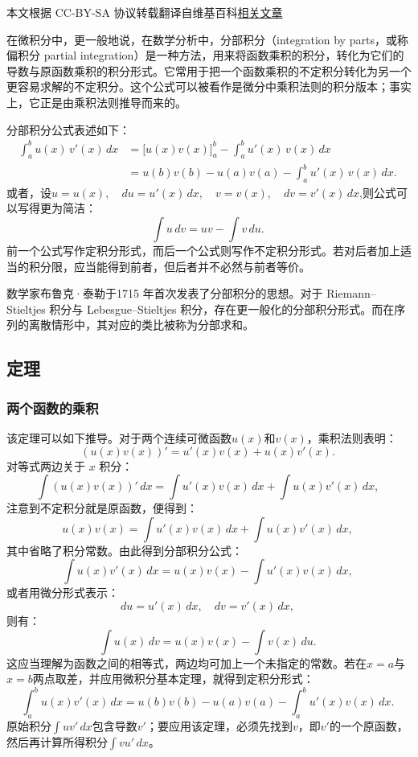 
本文根据 CC-BY-SA 协议转载翻译自维基百科\href{https://en.wikipedia.org/wiki/Integration_by_parts}{相关文章}

在微积分中，更一般地说，在数学分析中，分部积分（integration by parts，或称偏积分 partial integration）是一种方法，用来将函数乘积的积分，转化为它们的导数与原函数乘积的积分形式。它常用于把一个函数乘积的不定积分转化为另一个更容易求解的不定积分。这个公式可以被看作是微分中乘积法则的积分版本；事实上，它正是由乘积法则推导而来的。

分部积分公式表述如下：
$$
\begin{aligned}
\int_{a}^{b} u(x)\,v'(x)\,dx &= \Big[u(x)v(x)\Big]_{a}^{b} - \int_{a}^{b} u'(x)\,v(x)\,dx \\
&= u(b)v(b) - u(a)v(a) - \int_{a}^{b} u'(x)\,v(x)\,dx .
\end{aligned}~
$$
或者，设$u = u(x), \quad du = u'(x)\,dx, \quad v = v(x), \quad dv = v'(x)\,dx$,则公式可以写得更为简洁：
$$
\int u\,dv = uv - \int v\,du .~
$$
前一个公式写作定积分形式，而后一个公式则写作不定积分形式。若对后者加上适当的积分限，应当能得到前者，但后者并不必然与前者等价。

数学家布鲁克·泰勒于1715 年首次发表了分部积分的思想。对于 Riemann–Stieltjes 积分与 Lebesgue–Stieltjes 积分，存在更一般化的分部积分形式。而在序列的离散情形中，其对应的类比被称为分部求和。
\subsection{定理}
\subsubsection{两个函数的乘积}
该定理可以如下推导。对于两个连续可微函数$u(x)$和$v(x)$，乘积法则表明：
$$
(u(x)v(x))' = u'(x)v(x) + u(x)v'(x).~
$$
对等式两边关于 $x$ 积分：
$$
\int (u(x)v(x))'\,dx = \int u'(x)v(x)\,dx + \int u(x)v'(x)\,dx,~
$$
注意到不定积分就是原函数，便得到：
$$
u(x)v(x) = \int u'(x)v(x)\,dx + \int u(x)v'(x)\,dx,~
$$
其中省略了积分常数。由此得到分部积分公式：
$$
\int u(x)v'(x)\,dx = u(x)v(x) - \int u'(x)v(x)\,dx,~
$$
或者用微分形式表示：
$$
du = u'(x)\,dx, \quad dv = v'(x)\,dx,~
$$
则有：
$$
\int u(x)\,dv = u(x)v(x) - \int v(x)\,du.~
$$
这应当理解为函数之间的相等式，两边均可加上一个未指定的常数。若在$x=a$与$x=b$两点取差，并应用微积分基本定理，就得到定积分形式：
$$
\int_{a}^{b} u(x)v'(x)\,dx = u(b)v(b) - u(a)v(a) - \int_{a}^{b} u'(x)v(x)\,dx.~
$$
原始积分$\int u v'\,dx$包含导数$v'$；要应用该定理，必须先找到$v$，即$v'$的一个原函数，然后再计算所得积分$\int v u'\,dx$。
